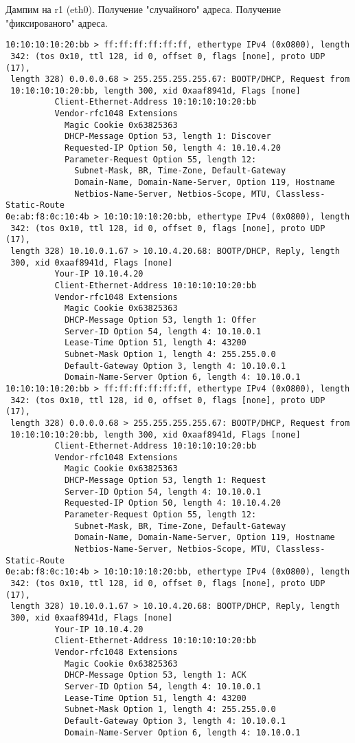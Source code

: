 \documentclass[a4paper,12pt]{article}
\begin{document}
Дампим на r1 (eth0). Получение "случайного" адреса. Получение "фиксированого" адреса.
\begin{lstlisting}
10:10:10:10:20:bb > ff:ff:ff:ff:ff:ff, ethertype IPv4 (0x0800), length
 342: (tos 0x10, ttl 128, id 0, offset 0, flags [none], proto UDP (17),
 length 328) 0.0.0.0.68 > 255.255.255.255.67: BOOTP/DHCP, Request from
 10:10:10:10:20:bb, length 300, xid 0xaaf8941d, Flags [none]
          Client-Ethernet-Address 10:10:10:10:20:bb
          Vendor-rfc1048 Extensions
            Magic Cookie 0x63825363
            DHCP-Message Option 53, length 1: Discover
            Requested-IP Option 50, length 4: 10.10.4.20
            Parameter-Request Option 55, length 12: 
              Subnet-Mask, BR, Time-Zone, Default-Gateway
              Domain-Name, Domain-Name-Server, Option 119, Hostname
              Netbios-Name-Server, Netbios-Scope, MTU, Classless-Static-Route
0e:ab:f8:0c:10:4b > 10:10:10:10:20:bb, ethertype IPv4 (0x0800), length
 342: (tos 0x10, ttl 128, id 0, offset 0, flags [none], proto UDP (17),
 length 328) 10.10.0.1.67 > 10.10.4.20.68: BOOTP/DHCP, Reply, length
 300, xid 0xaaf8941d, Flags [none]
          Your-IP 10.10.4.20
          Client-Ethernet-Address 10:10:10:10:20:bb
          Vendor-rfc1048 Extensions
            Magic Cookie 0x63825363
            DHCP-Message Option 53, length 1: Offer
            Server-ID Option 54, length 4: 10.10.0.1
            Lease-Time Option 51, length 4: 43200
            Subnet-Mask Option 1, length 4: 255.255.0.0
            Default-Gateway Option 3, length 4: 10.10.0.1
            Domain-Name-Server Option 6, length 4: 10.10.0.1
10:10:10:10:20:bb > ff:ff:ff:ff:ff:ff, ethertype IPv4 (0x0800), length
 342: (tos 0x10, ttl 128, id 0, offset 0, flags [none], proto UDP (17),
 length 328) 0.0.0.0.68 > 255.255.255.255.67: BOOTP/DHCP, Request from
 10:10:10:10:20:bb, length 300, xid 0xaaf8941d, Flags [none]
          Client-Ethernet-Address 10:10:10:10:20:bb
          Vendor-rfc1048 Extensions
            Magic Cookie 0x63825363
            DHCP-Message Option 53, length 1: Request
            Server-ID Option 54, length 4: 10.10.0.1
            Requested-IP Option 50, length 4: 10.10.4.20
            Parameter-Request Option 55, length 12: 
              Subnet-Mask, BR, Time-Zone, Default-Gateway
              Domain-Name, Domain-Name-Server, Option 119, Hostname
              Netbios-Name-Server, Netbios-Scope, MTU, Classless-Static-Route
0e:ab:f8:0c:10:4b > 10:10:10:10:20:bb, ethertype IPv4 (0x0800), length
 342: (tos 0x10, ttl 128, id 0, offset 0, flags [none], proto UDP (17),
 length 328) 10.10.0.1.67 > 10.10.4.20.68: BOOTP/DHCP, Reply, length
 300, xid 0xaaf8941d, Flags [none]
          Your-IP 10.10.4.20
          Client-Ethernet-Address 10:10:10:10:20:bb
          Vendor-rfc1048 Extensions
            Magic Cookie 0x63825363
            DHCP-Message Option 53, length 1: ACK
            Server-ID Option 54, length 4: 10.10.0.1
            Lease-Time Option 51, length 4: 43200
            Subnet-Mask Option 1, length 4: 255.255.0.0
            Default-Gateway Option 3, length 4: 10.10.0.1
            Domain-Name-Server Option 6, length 4: 10.10.0.1
\end{lstlisting}
\end{document}
